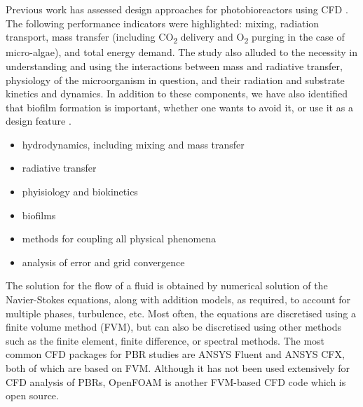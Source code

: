 Previous work has assessed design approaches for photobioreactors using CFD \cite{posten2009}. The following performance indicators were highlighted: mixing, radiation transport, mass transfer (including CO\textsubscript{2} delivery and O\textsubscript{2} purging in the case of micro-algae), and total energy demand. The study also alluded to the necessity in understanding and using the interactions between mass and radiative transfer, physiology of the microorganism in question, and their radiation and substrate kinetics and dynamics. In addition to these components, we have also identified that biofilm formation is important, whether one wants to avoid it, or use it as a design feature \cite{castro2017}.

\begin{itemize}
\item hydrodynamics, including mixing and mass transfer
\item radiative transfer
\item phyisiology and biokinetics
\item biofilms
\item methods for coupling all physical phenomena
\item analysis of error and grid convergence
\end{itemize}

The solution for the flow of a fluid is obtained by numerical solution of the Navier-Stokes equations, along with addition models, as required, to account for multiple phases, turbulence, etc. Most often, the equations are discretised using a finite volume method (FVM), but can also be discretised using other methods such as the finite element, finite difference, or spectral methods.  The most common CFD packages for PBR studies are ANSYS Fluent and ANSYS CFX, both of which are based on FVM.  Although it has not been used extensively for CFD analysis of PBRs, OpenFOAM is another FVM-based CFD code which is open source.


